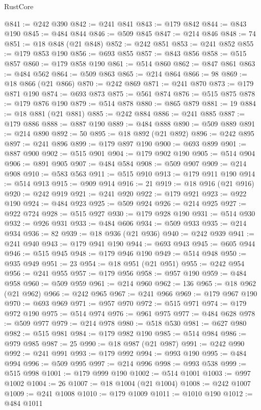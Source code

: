 \begin{lexlean}{RustCore}
\begin{coremodule}
@841 := @242 @390
@842 := @241 @841
@843 := @179 @842
@844 := @843 @190
@845 := @484 @844
@846 := @509 @845
@847 := @214 @846
@848 := 74
@851 := @18 @848 (@21 @848)
@852 := @242 @851
@853 := @241 @852
@855 := @179 @853 @190
@856 := @693 @855
@857 := @843 @856
@858 := @515 @857
@860 := @179 @858 @190
@861 := @514 @860
@862 := @847 @861
@863 := @484 @562
@864 := @509 @863
@865 := @214 @864
@866 := 98
@869 := @18 @866 (@21 @866)
@870 := @242 @869
@871 := @241 @870
@873 := @179 @871 @190
@874 := @693 @873
@875 := @561 @874
@876 := @515 @875
@878 := @179 @876 @190
@879 := @514 @878
@880 := @865 @879
@881 := 19
@884 := @18 @881 (@21 @881)
@885 := @242 @884
@886 := @241 @885
@887 := @179 @886
@888 := @887 @190
@889 := @484 @888
@890 := @509 @889
@891 := @214 @890
@892 := 50
@895 := @18 @892 (@21 @892)
@896 := @242 @895
@897 := @241 @896
@899 := @179 @897 @190
@900 := @693 @899
@901 := @887 @900
@902 := @515 @901
@904 := @179 @902 @190
@905 := @514 @904
@906 := @891 @905
@907 := @484 @584
@908 := @509 @907
@909 := @214 @908
@910 := @583 @563
@911 := @515 @910
@913 := @179 @911 @190
@914 := @514 @913
@915 := @909 @914
@916 := 21
@919 := @18 @916 (@21 @916)
@920 := @242 @919
@921 := @241 @920
@922 := @179 @921
@923 := @922 @190
@924 := @484 @923
@925 := @509 @924
@926 := @214 @925
@927 := @922 @724
@928 := @515 @927
@930 := @179 @928 @190
@931 := @514 @930
@932 := @926 @931
@933 := @484 @606
@934 := @509 @933
@935 := @214 @934
@936 := 82
@939 := @18 @936 (@21 @936)
@940 := @242 @939
@941 := @241 @940
@943 := @179 @941 @190
@944 := @693 @943
@945 := @605 @944
@946 := @515 @945
@948 := @179 @946 @190
@949 := @514 @948
@950 := @935 @949
@951 := 23
@954 := @18 @951 (@21 @951)
@955 := @242 @954
@956 := @241 @955
@957 := @179 @956
@958 := @957 @190
@959 := @484 @958
@960 := @509 @959
@961 := @214 @960
@962 := 136
@965 := @18 @962 (@21 @962)
@966 := @242 @965
@967 := @241 @966
@969 := @179 @967 @190
@970 := @693 @969
@971 := @957 @970
@972 := @515 @971
@974 := @179 @972 @190
@975 := @514 @974
@976 := @961 @975
@977 := @484 @628
@978 := @509 @977
@979 := @214 @978
@980 := @518 @530
@981 := @627 @980
@982 := @515 @981
@984 := @179 @982 @190
@985 := @514 @984
@986 := @979 @985
@987 := 25
@990 := @18 @987 (@21 @987)
@991 := @242 @990
@992 := @241 @991
@993 := @179 @992
@994 := @993 @190
@995 := @484 @994
@996 := @509 @995
@997 := @214 @996
@998 := @993 @538
@999 := @515 @998
@1001 := @179 @999 @190
@1002 := @514 @1001
@1003 := @997 @1002
@1004 := 26
@1007 := @18 @1004 (@21 @1004)
@1008 := @242 @1007
@1009 := @241 @1008
@1010 := @179 @1009
@1011 := @1010 @190
@1012 := @484 @1011

\end{coremodule}
\end{lexlean}
